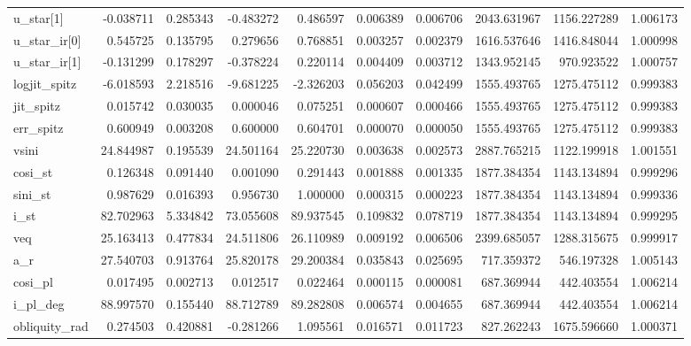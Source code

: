 \begin{tabular}{lrrrrrrrrr}
u\_star[1]     &   -0.038711 &   0.285343 &   -0.483272 &    0.486597 &   0.006389 &  0.006706 &  2043.631967 &  1156.227289 &  1.006173 \\
u\_star\_ir[0]  &    0.545725 &   0.135795 &    0.279656 &    0.768851 &   0.003257 &  0.002379 &  1616.537646 &  1416.848044 &  1.000998 \\
u\_star\_ir[1]  &   -0.131299 &   0.178297 &   -0.378224 &    0.220114 &   0.004409 &  0.003712 &  1343.952145 &   970.923522 &  1.000757 \\
logjit\_spitz  &   -6.018593 &   2.218516 &   -9.681225 &   -2.326203 &   0.056203 &  0.042499 &  1555.493765 &  1275.475112 &  0.999383 \\
jit\_spitz     &    0.015742 &   0.030035 &    0.000046 &    0.075251 &   0.000607 &  0.000466 &  1555.493765 &  1275.475112 &  0.999383 \\
err\_spitz     &    0.600949 &   0.003208 &    0.600000 &    0.604701 &   0.000070 &  0.000050 &  1555.493765 &  1275.475112 &  0.999383 \\
vsini         &   24.844987 &   0.195539 &   24.501164 &   25.220730 &   0.003638 &  0.002573 &  2887.765215 &  1122.199918 &  1.001551 \\
cosi\_st       &    0.126348 &   0.091440 &    0.001090 &    0.291443 &   0.001888 &  0.001335 &  1877.384354 &  1143.134894 &  0.999296 \\
sini\_st       &    0.987629 &   0.016393 &    0.956730 &    1.000000 &   0.000315 &  0.000223 &  1877.384354 &  1143.134894 &  0.999336 \\
i\_st          &   82.702963 &   5.334842 &   73.055608 &   89.937545 &   0.109832 &  0.078719 &  1877.384354 &  1143.134894 &  0.999295 \\
veq           &   25.163413 &   0.477834 &   24.511806 &   26.110989 &   0.009192 &  0.006506 &  2399.685057 &  1288.315675 &  0.999917 \\
a\_r           &   27.540703 &   0.913764 &   25.820178 &   29.200384 &   0.035843 &  0.025695 &   717.359372 &   546.197328 &  1.005143 \\
cosi\_pl       &    0.017495 &   0.002713 &    0.012517 &    0.022464 &   0.000115 &  0.000081 &   687.369944 &   442.403554 &  1.006214 \\
i\_pl\_deg      &   88.997570 &   0.155440 &   88.712789 &   89.282808 &   0.006574 &  0.004655 &   687.369944 &   442.403554 &  1.006214 \\
obliquity\_rad &    0.274503 &   0.420881 &   -0.281266 &    1.095561 &   0.016571 &  0.011723 &   827.262243 &  1675.596660 &  1.000371 \\

\end{tabular}
